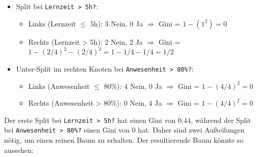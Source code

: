 \begin{myexercise}
    \begin{myanswer}
        \begin{itemize}
            \item Split bei \texttt{Lernzeit > 5h?}:
                  \begin{itemize}
                      \item Links (Lernzeit $\leq$ 5h): 3 Nein, 0 Ja $\Rightarrow$ Gini = $1 - (1^2) = 0$
                      \item Rechts (Lernzeit > 5h): 2 Nein, 2 Ja $\Rightarrow$ Gini = $1 - (2/4)^2 - (2/4)^2 = 1 - 1/4 - 1/4 = 1/2$
                  \end{itemize}
            \item Unter-Split im rechten Knoten bei \texttt{Anwesenheit > 80\%?}:
                  \begin{itemize}
                      \item Links (Anwesenheit $\leq$ 80\%): 4 Nein, 0 Ja $\Rightarrow$ Gini = $1 - (4/4)^2 = 0$
                      \item Rechts (Anwesenheit > 80\%): 0 Nein, 4 Ja $\Rightarrow$ Gini = $1 - (4/4)^2 = 0$
                  \end{itemize}
        \end{itemize}
        Der erste Split bei \texttt{Lernzeit > 5h?} hat einen Gini von 0.44, während der Split bei \texttt{Anwesenheit > 80\%?} einen Gini von 0 hat. Daher sind zwei Aufteilungen nötig, um einen reinen Baum zu erhalten. Der resultierende Baum könnte so aussehen:
        \begin{center}
        \end{center}

    \end{myanswer}
\end{myexercise}

